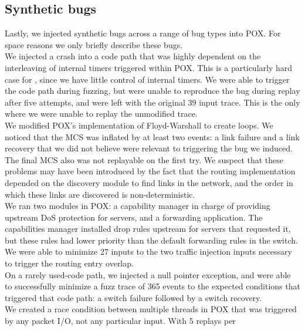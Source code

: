 \subsection{Synthetic bugs}
Lastly, we injected synthetic bugs across a range of bug types into POX. For space
reasons we only briefly describe these bugs.\\[0.5ex]
%
We injected a crash into a code path that was highly dependent on the
interleaving of internal timers triggered within POX. This is a particularly
hard case for \projectname, since we have little control of internal timers.
We were able to trigger the code path during fuzzing, but were unable to
reproduce the bug during replay after five attempts, and were left with the
original 39 input trace. This is the only where we were
unable to replay the unmodified trace.\\[0.5ex]
%
We modified POX's implementation of Floyd-Warshall to create loops.
We noticed that the MCS was inflated by at least two events: a link failure
and a link recovery that we did not believe were relevant to triggering the bug we
induced. The final MCS also was not replayable on the first try.
We suspect that these problems may have been introduced by the fact that the
routing implementation depended on the discovery module to find links in the
network, and the order in which these links are discovered is
non-deterministic.\\[0.5ex]
%
We ran two modules in POX: a capability manager in charge of providing
upstream DoS protection for servers, and a forwarding application. The
capabilities manager installed drop rules upstream for servers that requested
it, but these rules had lower priority than the default forwarding rules in
the switch. We were able to minimize 27 inputs to the two traffic injection
inputs necessary to trigger the routing entry overlap.\\[0.5ex]
%
On a rarely used-code path, we injected a null pointer exception,
and were able to successfully minimize a fuzz trace of 365 events to the
expected conditions that triggered that code path: a switch failure followed
by a switch recovery.\\[0.5ex]
%
We created a race condition between multiple threads in POX that was
triggered by any packet I/O, not any particular input. With 5 replays per
